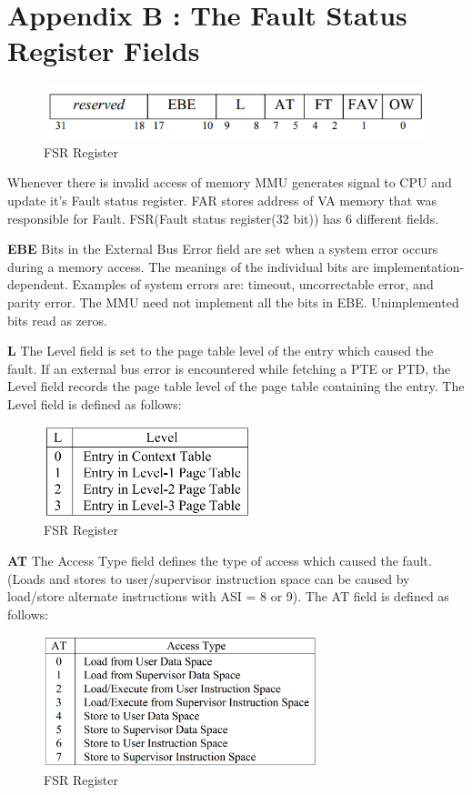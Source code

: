 \documentclass[12pt,a4paper]{article}
\begin{document}
 
\section{Appendix B : The Fault Status Register Fields}

\begin{figure}[h]
\centering
\includegraphics[width=12cm]{./figs/FSR.png}
\caption{FSR Register}
\label{fig:example2_1}
\end{figure}


Whenever there is invalid access of memory MMU generates signal to CPU and update it's Fault status register. FAR stores address of VA memory that was responsible for Fault.
FSR(Fault status register(32 bit)) has 6 different fields.

\textbf{EBE}  Bits in the External Bus Error field are set when a system error occurs
during a memory access. The meanings of the individual bits are
implementation-dependent. Examples of system errors are: timeout,
uncorrectable error, and parity error. The MMU need not implement all
the bits in EBE. Unimplemented bits read as zeros.
 
 \textbf{L}
  The Level field is set to the page table level of the entry which caused the
fault. If an external bus error is encountered while fetching a PTE or
PTD, the Level field records the page table level of the page table containing the entry.
The Level field is defined as follows:
\begin{figure}[h]
\centering
\includegraphics[width=6cm]{./figs/level_FSR.png}
\caption{FSR Register}
\label{fig:level_FSR}
\end{figure}

 \textbf{AT} The Access Type field defines the type of access which caused the fault.
(Loads and stores to user/supervisor instruction space can be caused by
load/store alternate instructions with ASI = 8 or 9). The AT field is defined as follows:
\begin{figure}[h]
\centering
\includegraphics[width=8cm]{./figs/AT.png}
\caption{FSR Register}
\label{fig:AT}
\end{figure}
\end{document}
